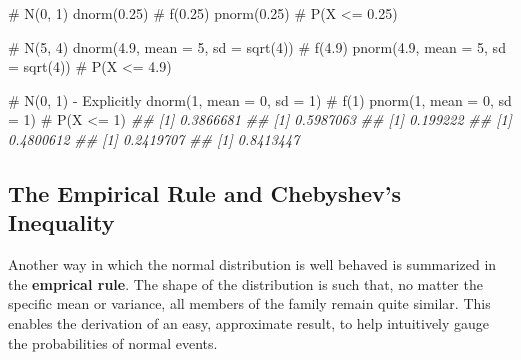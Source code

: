 \documentclass[
  letterpaper,
  DIV=11,
  numbers=noendperiod]{scrreprt}
\newenvironment{Shaded}{\begin{snugshade}}{\end{snugshade}}
\newcommand{\AttributeTok}[1]{\textcolor[rgb]{0.40,0.45,0.13}{#1}}
\newcommand{\CommentTok}[1]{\textcolor[rgb]{0.37,0.37,0.37}{#1}}
\newcommand{\DecValTok}[1]{\textcolor[rgb]{0.68,0.00,0.00}{#1}}
\newcommand{\DocumentationTok}[1]{\textcolor[rgb]{0.37,0.37,0.37}{\textit{#1}}}
\newcommand{\FloatTok}[1]{\textcolor[rgb]{0.68,0.00,0.00}{#1}}
\newcommand{\FunctionTok}[1]{\textcolor[rgb]{0.28,0.35,0.67}{#1}}
\newcommand{\NormalTok}[1]{\textcolor[rgb]{0.00,0.23,0.31}{#1}}
\theoremstyle{definition}
\theoremstyle{definition}
\theoremstyle{definition}
\theoremstyle{remark}
\begin{document}
\begin{Shaded}
\begin{Highlighting}[]
\CommentTok{\# N(0, 1)}
\FunctionTok{dnorm}\NormalTok{(}\FloatTok{0.25}\NormalTok{) }\CommentTok{\# f(0.25)}
\FunctionTok{pnorm}\NormalTok{(}\FloatTok{0.25}\NormalTok{) }\CommentTok{\# P(X \textless{}= 0.25)}

\CommentTok{\# N(5, 4)}
\FunctionTok{dnorm}\NormalTok{(}\FloatTok{4.9}\NormalTok{, }\AttributeTok{mean =} \DecValTok{5}\NormalTok{, }\AttributeTok{sd =} \FunctionTok{sqrt}\NormalTok{(}\DecValTok{4}\NormalTok{)) }\CommentTok{\# f(4.9)}
\FunctionTok{pnorm}\NormalTok{(}\FloatTok{4.9}\NormalTok{, }\AttributeTok{mean =} \DecValTok{5}\NormalTok{, }\AttributeTok{sd =} \FunctionTok{sqrt}\NormalTok{(}\DecValTok{4}\NormalTok{)) }\CommentTok{\# P(X \textless{}= 4.9)}

\CommentTok{\# N(0, 1) {-} Explicitly}
\FunctionTok{dnorm}\NormalTok{(}\DecValTok{1}\NormalTok{, }\AttributeTok{mean =} \DecValTok{0}\NormalTok{, }\AttributeTok{sd =} \DecValTok{1}\NormalTok{) }\CommentTok{\# f(1)}
\FunctionTok{pnorm}\NormalTok{(}\DecValTok{1}\NormalTok{, }\AttributeTok{mean =} \DecValTok{0}\NormalTok{, }\AttributeTok{sd =} \DecValTok{1}\NormalTok{) }\CommentTok{\# P(X \textless{}= 1)}
\DocumentationTok{\#\# [1] 0.3866681}
\DocumentationTok{\#\# [1] 0.5987063}
\DocumentationTok{\#\# [1] 0.199222}
\DocumentationTok{\#\# [1] 0.4800612}
\DocumentationTok{\#\# [1] 0.2419707}
\DocumentationTok{\#\# [1] 0.8413447}
\end{Highlighting}
\end{Shaded}

\subsection{The Empirical Rule and Chebyshev's
Inequality}\label{the-empirical-rule-and-chebyshevs-inequality}

Another way in which the normal distribution is well behaved is
summarized in the \textbf{emprical rule}. The shape of the distribution
is such that, no matter the specific mean or variance, all members of
the family remain quite similar. This enables the derivation of an easy,
approximate result, to help intuitively gauge the probabilities of
normal events.
\end{document}
